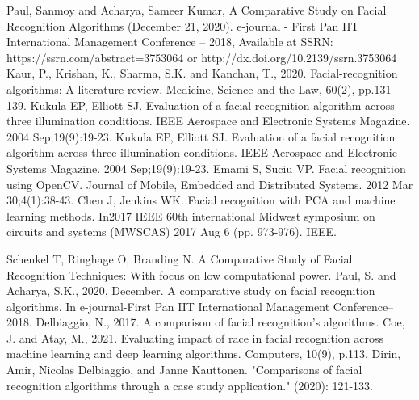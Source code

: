 \documentclass[openany]{report}
\begin{document}
\begin{thebibliography}{10}
    Paul, Sanmoy and Acharya, Sameer Kumar, A Comparative Study on Facial Recognition Algorithms (December 21, 2020). e-journal - First Pan IIT International Management Conference – 2018, Available at SSRN: https://ssrn.com/abstract=3753064 or http://dx.doi.org/10.2139/ssrn.3753064
    Kaur, P., Krishan, K., Sharma, S.K. and Kanchan, T., 2020. Facial-recognition algorithms: A literature review. Medicine, Science and the Law, 60(2), pp.131-139.
    Kukula EP, Elliott SJ. Evaluation of a facial recognition algorithm across three illumination conditions. IEEE Aerospace and Electronic Systems Magazine. 2004 Sep;19(9):19-23.
    Kukula EP, Elliott SJ. Evaluation of a facial recognition algorithm across three illumination conditions. IEEE Aerospace and Electronic Systems Magazine. 2004 Sep;19(9):19-23.
    Emami S, Suciu VP. Facial recognition using OpenCV. Journal of Mobile, Embedded and Distributed Systems. 2012 Mar 30;4(1):38-43.
    Chen J, Jenkins WK. Facial recognition with PCA and machine learning methods. In2017 IEEE 60th international Midwest symposium on circuits and systems (MWSCAS) 2017 Aug 6 (pp. 973-976). IEEE.

    Schenkel T, Ringhage O, Branding N. A Comparative Study of Facial Recognition Techniques: With focus on low computational power.
    Paul, S. and Acharya, S.K., 2020, December. A comparative study on facial recognition algorithms. In e-journal-First Pan IIT International Management Conference–2018.
    Delbiaggio, N., 2017. A comparison of facial recognition’s algorithms.
    Coe, J. and Atay, M., 2021. Evaluating impact of race in facial recognition across machine learning and deep learning algorithms. Computers, 10(9), p.113.
    Dirin, Amir, Nicolas Delbiaggio, and Janne Kauttonen. "Comparisons of facial recognition algorithms through a case study application." (2020): 121-133.

\end{thebibliography}
\end{document}
